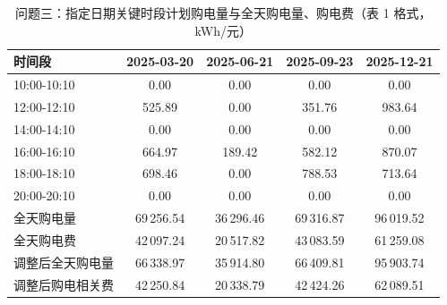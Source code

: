 \documentclass[12pt,a4paper,fontset=fandol]{ctexart}
\begin{document}
\begin{table}[htbp]
\centering
\caption{问题三\nobreak：指定日期关键时段计划购电量与全天购电量\nobreak、购电费（表 1 格式\nobreak，kWh/元\nobreak）}
\label{tab:q3t1}
\begin{tabular}{@{}lcccc@{}}
\toprule
时间段 & 2025-03-20 & 2025-06-21 & 2025-09-23 & 2025-12-21 \\
\midrule
10:00-10:10 & 0.00 & 0.00 & 0.00 & 0.00 \\
12:00-12:10 & 525.89 & 0.00 & 351.76 & 983.64 \\
14:00-14:10 & 0.00 & 0.00 & 0.00 & 0.00 \\
16:00-16:10 & 664.97 & 189.42 & 582.12 & 870.07 \\
18:00-18:10 & 698.46 & 0.00 & 788.53 & 713.64 \\
20:00-20:10 & 0.00 & 0.00 & 0.00 & 0.00 \\
\midrule
全天购电量 & 69\,256.54 & 36\,296.46 & 69\,316.87 & 96\,019.52 \\
全天购电费 & 42\,097.24 & 20\,517.82 & 43\,083.59 & 61\,259.08 \\
调整后全天购电量 & 66\,338.97 & 35\,914.80 & 66\,409.81 & 95\,903.74 \\
调整后购电相关费 & 42\,250.84 & 20\,338.79 & 42\,424.26 & 62\,089.51 \\
\bottomrule
\end{tabular}
\end{table}
\end{document}
